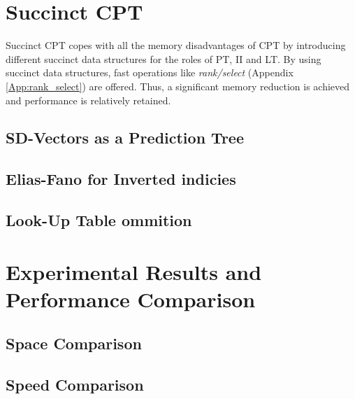 \section{Succinct CPT}\label{ccpt}
Succinct CPT copes with all the memory disadvantages of CPT by introducing different succinct data structures for the roles of PT, II and LT. By using succinct data structures, fast operations like \emph{rank/select} (Appendix \ref{App:rank_select}) are offered. Thus, a significant memory reduction is achieved and performance is relatively retained.
\subsection{SD-Vectors as a Prediction Tree}
\subsection{Elias-Fano for Inverted indicies}
\subsection{Look-Up Table ommition}
\section{Experimental Results and Performance Comparison} \label{experimental}
\subsection{Space Comparison}
\subsection{Speed Comparison}



\newpage